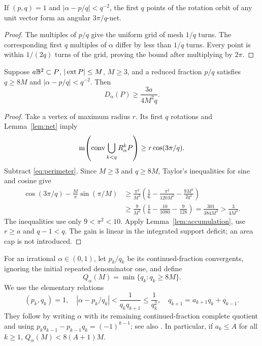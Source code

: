 \begin{lemma}\label{lem:net}
If $(p,q)=1$ and $|\alpha-p/q|<q^{-2}$, the first $q$ points of the
rotation orbit of any unit vector form an angular $3\pi/q$-net.
\end{lemma}
\begin{proof}
The multiples of $p/q$ give the uniform grid of mesh $1/q$ turns.
The corresponding first $q$ multiples of $\alpha$ differ by less than
$1/q$ turns. Every point is within $1/(2q)$ turns of the grid, proving
the bound after multiplying by $2\pi$.
\end{proof}

\begin{theorem}
\label{thm:mean-growth}
Suppose $a\mathbb B^2\subset P$, $|\operatorname{ext} P|\le M$, $M\ge3$, and a reduced
fraction $p/q$ satisfies $q\ge8M$ and $|\alpha-p/q|<q^{-2}$. Then
\begin{equation}\label{eq:gain-q}
                        D_\alpha(P)\ge\frac{3a}{4M^2q}.
\end{equation}
\end{theorem}
\begin{proof}
Take a vertex of maximum radius $r$. Its first $q$ rotations and
Lemma~\ref{lem:net} imply
\[
 \operatorname{m}\!\left(\operatorname{conv}\bigcup_{k<q}R_\alpha^k P\right)
                              \ge r\cos(3\pi/q).
\]
Subtract \eqref{eq:perimeter}. Since $M\ge3$ and $q\ge8M$,
Taylor's inequalities for sine and cosine give
\begin{align*}
 \cos(3\pi/q)-\frac M\pi\sin(\pi/M)
 &\ge \frac{\pi^2}{M^2}
       \left(\frac16-\frac{\pi^2}{120M^2}-\frac{9M^2}{2q^2}\right)\\
 &\ge\frac9{M^2}\left(\frac16-\frac{10}{1080}-\frac9{128}\right)
   =\frac{301}{384M^2}>\frac3{4M^2}.
\end{align*}
The inequalities use only $9<\pi^2<10$. Apply
Lemma~\ref{lem:accumulation}, use $r\ge a$ and $q-1<q$.
The gain is linear in the integrated support deficit; an area cap is
not introduced.
\end{proof}

For an irrational $\alpha\in(0,1)$, let $p_k/q_k$ be its continued-fraction
convergents, ignoring the initial repeated denominator one, and define
\begin{equation}\label{eq:denominator-function}
 Q_\alpha(M)=\min\{q_k:q_k\ge8M\}.
\end{equation}
We use the elementary relations
\begin{equation}\label{eq:cf}
 (p_k,q_k)=1,\quad
 |\alpha-p_k/q_k|<\frac1{q_kq_{k+1}}\le\frac1{q_k^2},\quad
 q_{k+1}=a_{k+1}q_k+q_{k-1}.
\end{equation}
They follow by writing $\alpha$ with its remaining continued-fraction
complete quotient and using
$p_kq_{k-1}-p_{k-1}q_k=(-1)^{k-1}$; see also \cite{Khinchin}.
In particular, if $a_k\le A$ for all $k\ge1$,
$Q_\alpha(M)<8(A+1)M$.

